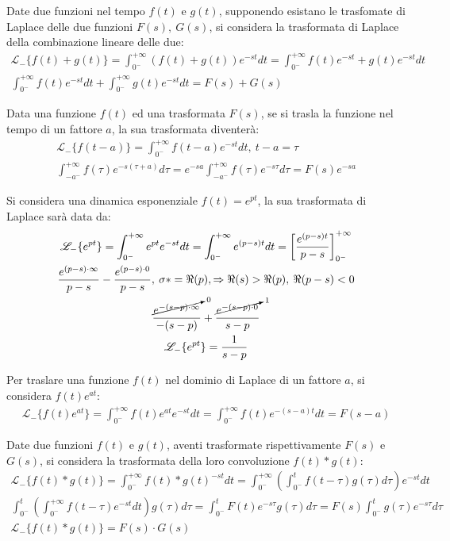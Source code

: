 \documentclass{article}
\numberwithin{equation}{subsection}
\begin{document}
Date due funzioni nel tempo $f(t)$ e $g(t)$, supponendo esistano le trasfomate di Laplace delle due funzioni $F(s),\:G(s)$, si considera la trasformata di Laplace 
della combinazione lineare delle due: 
\begin{gather}
    \mathscr{L}_-\{f(t)+g(t)\}=\displaystyle\int_{0^-}^{+\infty}\left(f(t)+g(t)\right)e^{-st}dt=\int_{0^-}^{+\infty}f(t)e^{-st}+g(t)e^{-st}dt\\
    \displaystyle\int_{0^-}^{+\infty}f(t)e^{-st}dt+\int_{0^-}^{+\infty}g(t)e^{-st}dt=F(s)+G(s)
\end{gather}

Data una funzione $f(t)$ ed una trasformata $F(s)$, se si trasla la funzione nel tempo di un fattore $a$, la sua trasformata diventerà:
\begin{gather}
    \mathscr{L}_-\{f(t-a)\}=\displaystyle\int_{0^-}^{+\infty}f(t-a)e^{-st}dt,\:t-a=\tau\\
    \displaystyle\int_{-a^-}^{+\infty}f(\tau)e^{-s(\tau+a)}d\tau=e^{-sa}\int_{-a^-}^{+\infty}f(\tau)e^{-s\tau}d\tau=F(s)e^{-sa}
\end{gather}


Si considera una dinamica esponenziale $f(t)=e^{pt}$, la sua trasformata di Laplace sarà data da:
\begin{gather}
    \mathscr{L}_-\{e^{pt}\}=\displaystyle\int_{0^-}^{+\infty}e^{pt}e^{-st}dt=\int_{0^-}^{+\infty}e^{(p-s)t}dt=\left[\frac{e^{(p-s)t}}{p-s}\right]^{+\infty}_{0^-}\\
    \displaystyle\frac{e^{(p-s)\cdot\infty}}{p-s}-\frac{e^{(p-s)\cdot0}}{p-s},\:\sigma*=\Re(p),\Rightarrow \Re(s)>\Re(p),\:\Re(p-s)<0\\
    \displaystyle\frac{\cancelto{0}{e^{-(s-p)\cdot\infty}}}{-(s-p)}+\frac{\cancelto{1}{e^{-(s-p)\cdot0}}}{s-p}\\
    \mathscr{L}_-\{e^{pt}\}=\displaystyle\frac{1}{s-p}
\end{gather}


Per traslare una funzione $f(t)$ nel dominio di Laplace di un fattore $a$, si considera $f(t)e^{at}$:
\begin{gather}
    \mathscr{L}_-\{f(t)e^{at}\}=\displaystyle\int_{0^-}^{+\infty}f(t)e^{at}e^{-st}dt=\int_{0^-}^{+\infty}f(t)e^{-(s-a)t}dt=F(s-a)
\end{gather}

Date due funzioni $f(t)$ e $g(t)$, aventi trasformate rispettivamente $F(s)$ e $G(s)$, si considera la trasformata della loro convoluzione $f(t)*g(t)$:
\begin{gather}
    \mathscr{L}_-\{f(t)*g(t)\}=\displaystyle\int_{0^-}^{+\infty}f(t)*g(t)^{-st}dt=\int_{0^-}^{+\infty}\left(\int_{0^-}^{t}f(t-\tau)g(\tau)d\tau\right)e^{-st} dt\\
    \displaystyle\int_{0^-}^{t}\left(\int_{0^-}^{+\infty}f(t-\tau)e^{-st}dt\right)g(\tau)d\tau=\int_{0^-}^{t}F(t)e^{-s\tau}g(\tau)d\tau=F(s)\int_{0^-}^{t}g(\tau)e^{-s\tau}d\tau\\
    \mathscr{L}_-\{f(t)*g(t)\}=F(s)\cdot G(s)
\end{gather}
\end{document}
